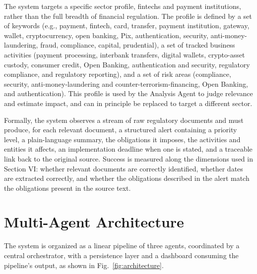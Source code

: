 \documentclass[conference]{IEEEtran}
\begin{document}
The system targets a specific sector profile, fintechs and payment institutions, rather than the full breadth of financial regulation. The profile is defined by a set of keywords (e.g., payment, fintech, card, transfer, payment institution, gateway, wallet, cryptocurrency, open banking, Pix, authentication, security, anti-money-laundering, fraud, compliance, capital, prudential), a set of tracked business activities (payment processing, interbank transfers, digital wallets, crypto-asset custody, consumer credit, Open Banking, authentication and security, regulatory compliance, and regulatory reporting), and a set of risk areas (compliance, security, anti-money-laundering and counter-terrorism-financing, Open Banking, and authentication). This profile is used by the Analysis Agent to judge relevance and estimate impact, and can in principle be replaced to target a different sector.

Formally, the system observes a stream of raw regulatory documents and must produce, for each relevant document, a structured alert containing a priority level, a plain-language summary, the obligations it imposes, the activities and entities it affects, an implementation deadline when one is stated, and a traceable link back to the original source. Success is measured along the dimensions used in Section VI: whether relevant documents are correctly identified, whether dates are extracted correctly, and whether the obligations described in the alert match the obligations present in the source text.

\section{Multi-Agent Architecture}

The system is organized as a linear pipeline of three agents, coordinated by a central orchestrator, with a persistence layer and a dashboard consuming the pipeline's output, as shown in Fig.~\ref{fig:architecture}.
\end{document}
